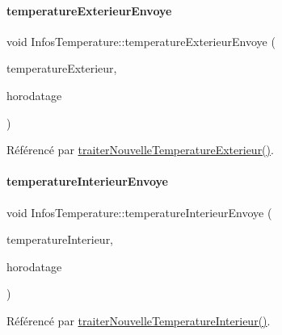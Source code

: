 \paragraph{\texorpdfstring{temperature\+Exterieur\+Envoye}{temperatureExterieurEnvoye}}
{\footnotesize\ttfamily void Infos\+Temperature\+::temperature\+Exterieur\+Envoye (\begin{DoxyParamCaption}\item[{const double}]{temperature\+Exterieur,  }\item[{Q\+String}]{horodatage }\end{DoxyParamCaption})\hspace{0.3cm}{\ttfamily [signal]}}



Référencé par \hyperlink{class_infos_temperature_ab8d95f48c31ca17c8690849562268420}{traiter\+Nouvelle\+Temperature\+Exterieur()}.

\mbox{\label{class_infos_temperature_acaff5cc6bedc53a8bf2c914957d2ab47}} 
\paragraph{\texorpdfstring{temperature\+Interieur\+Envoye}{temperatureInterieurEnvoye}}
{\footnotesize\ttfamily void Infos\+Temperature\+::temperature\+Interieur\+Envoye (\begin{DoxyParamCaption}\item[{const double}]{temperature\+Interieur,  }\item[{Q\+String}]{horodatage }\end{DoxyParamCaption})\hspace{0.3cm}{\ttfamily [signal]}}



Référencé par \hyperlink{class_infos_temperature_a547da18a7c04603d2f30eece061d9634}{traiter\+Nouvelle\+Temperature\+Interieur()}.

\mbox{\label{class_infos_temperature_aaebee9d6151257fa1f182665d0fecf2c}} 
